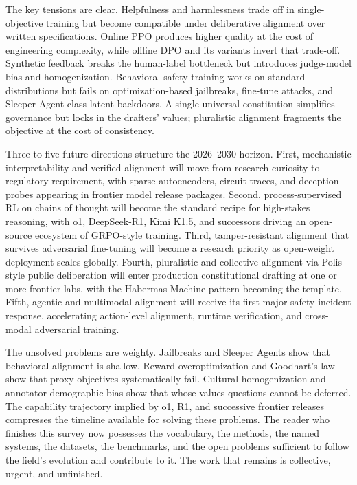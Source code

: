 \documentclass{article}
\begin{document}
The key tensions are clear. Helpfulness and harmlessness trade off in single-objective training but become compatible under deliberative alignment over written specifications. Online PPO produces higher quality at the cost of engineering complexity, while offline DPO and its variants invert that trade-off. Synthetic feedback breaks the human-label bottleneck but introduces judge-model bias and homogenization. Behavioral safety training works on standard distributions but fails on optimization-based jailbreaks, fine-tune attacks, and Sleeper-Agent-class latent backdoors. A single universal constitution simplifies governance but locks in the drafters' values; pluralistic alignment fragments the objective at the cost of consistency.

Three to five future directions structure the 2026--2030 horizon. First, mechanistic interpretability and verified alignment will move from research curiosity to regulatory requirement, with sparse autoencoders, circuit traces, and deception probes appearing in frontier model release packages. Second, process-supervised RL on chains of thought will become the standard recipe for high-stakes reasoning, with o1, DeepSeek-R1, Kimi K1.5, and successors driving an open-source ecosystem of GRPO-style training. Third, tamper-resistant alignment that survives adversarial fine-tuning will become a research priority as open-weight deployment scales globally. Fourth, pluralistic and collective alignment via Polis-style public deliberation will enter production constitutional drafting at one or more frontier labs, with the Habermas Machine pattern becoming the template. Fifth, agentic and multimodal alignment will receive its first major safety incident response, accelerating action-level alignment, runtime verification, and cross-modal adversarial training.

The unsolved problems are weighty. Jailbreaks and Sleeper Agents show that behavioral alignment is shallow. Reward overoptimization and Goodhart's law show that proxy objectives systematically fail. Cultural homogenization and annotator demographic bias show that whose-values questions cannot be deferred. The capability trajectory implied by o1, R1, and successive frontier releases compresses the timeline available for solving these problems. The reader who finishes this survey now possesses the vocabulary, the methods, the named systems, the datasets, the benchmarks, and the open problems sufficient to follow the field's evolution and contribute to it. The work that remains is collective, urgent, and unfinished.



\end{document}
